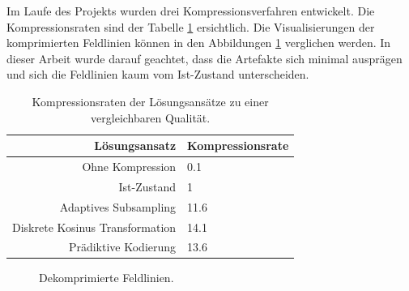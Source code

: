 Im Laufe des Projekts wurden drei Kompressionsverfahren entwickelt. Die Kompressionsraten sind der Tabelle \ref{einleitung:tabelle} ersichtlich. Die Visualisierungen der komprimierten Feldlinien können in den Abbildungen \ref{einleitung:artefakte} verglichen werden. In dieser Arbeit wurde darauf geachtet, dass die Artefakte sich minimal ausprägen und sich die Feldlinien kaum vom Ist-Zustand unterscheiden.
\begin{table}[!htbp]
	\center
	\begin{tabular}{r|l}
		Lösungsansatz & Kompressionsrate \\\hline
		Ohne Kompression & 0.1\\
		Ist-Zustand & 1\\
		Adaptives Subsampling & 11.6 \\
		Diskrete Kosinus Transformation & 14.1 \\
		Prädiktive Kodierung & 13.6\\
	\end{tabular}
	\caption{Kompressionsraten der Lösungsansätze zu einer vergleichbaren Qualität.}
	\label{einleitung:tabelle}
\end{table}
\begin{figure}[!htbp]
\center
{}
\caption{Dekomprimierte Feldlinien.}
\label{einleitung:artefakte}
\end{figure}
